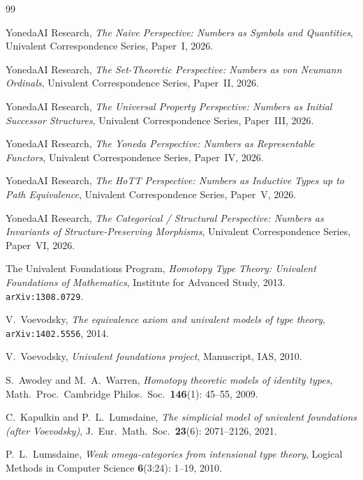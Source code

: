 \documentclass[12pt]{article}
\theoremstyle{definition}
\theoremstyle{remark}
\begin{document}
\begin{thebibliography}{99}


YonedaAI Research,
\emph{The Naive Perspective: Numbers as Symbols and Quantities},
Univalent Correspondence Series, Paper~I, 2026.

YonedaAI Research,
\emph{The Set-Theoretic Perspective: Numbers as von Neumann Ordinals},
Univalent Correspondence Series, Paper~II, 2026.

YonedaAI Research,
\emph{The Universal Property Perspective: Numbers as Initial Successor Structures},
Univalent Correspondence Series, Paper~III, 2026.

YonedaAI Research,
\emph{The Yoneda Perspective: Numbers as Representable Functors},
Univalent Correspondence Series, Paper~IV, 2026.

YonedaAI Research,
\emph{The HoTT Perspective: Numbers as Inductive Types up to Path Equivalence},
Univalent Correspondence Series, Paper~V, 2026.

YonedaAI Research,
\emph{The Categorical / Structural Perspective: Numbers as Invariants of Structure-Preserving Morphisms},
Univalent Correspondence Series, Paper~VI, 2026.


The Univalent Foundations Program,
\emph{Homotopy Type Theory: Univalent Foundations of Mathematics},
Institute for Advanced Study, 2013.
\texttt{arXiv:1308.0729}.

V.~Voevodsky,
\emph{The equivalence axiom and univalent models of type theory},
\texttt{arXiv:1402.5556}, 2014.

V.~Voevodsky,
\emph{Univalent foundations project},
Manuscript, IAS, 2010.

S.~Awodey and M.~A.~Warren,
\emph{Homotopy theoretic models of identity types},
Math.\ Proc.\ Cambridge Philos.\ Soc.\ \textbf{146}(1): 45--55, 2009.

C.~Kapulkin and P.~L.~Lumsdaine,
\emph{The simplicial model of univalent foundations (after Voevodsky)},
J.\ Eur.\ Math.\ Soc.\ \textbf{23}(6): 2071--2126, 2021.

P.~L.~Lumsdaine,
\emph{Weak omega-categories from intensional type theory},
Logical Methods in Computer Science \textbf{6}(3:24): 1--19, 2010.


\end{thebibliography}
\end{document}
